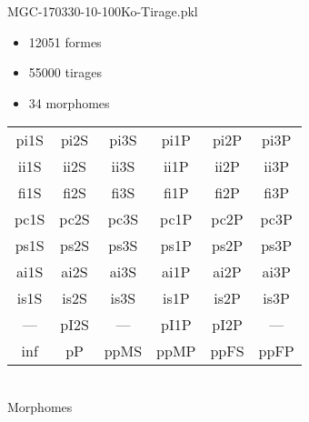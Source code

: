 MGC-170330-10-100Ko-Tirage.pkl
\begin{itemize}
\item 12051 formes
\item 55000 tirages
\item 34 morphomes
\end{itemize}
\begin{center}
\begin{tabular}{cccccc}
\hline
\cellcolor{white}pi1S & \cellcolor{orange}pi2S & \cellcolor{orange}pi3S & \cellcolor{white}pi1P & \cellcolor{white}pi2P & \cellcolor{white}pi3P\\
\cellcolor{brown}ii1S & \cellcolor{brown}ii2S & \cellcolor{brown}ii3S & \cellcolor{white}ii1P & \cellcolor{white}ii2P & \cellcolor{brown}ii3P\\
\cellcolor{yellow}fi1S & \cellcolor{lime}fi2S & \cellcolor{lime}fi3S & \cellcolor{green}fi1P & \cellcolor{white}fi2P & \cellcolor{green}fi3P\\
\cellcolor{yellow}pc1S & \cellcolor{yellow}pc2S & \cellcolor{yellow}pc3S & \cellcolor{white}pc1P & \cellcolor{white}pc2P & \cellcolor{yellow}pc3P\\
\cellcolor{teal}ps1S & \cellcolor{white}ps2S & \cellcolor{teal}ps3S & \cellcolor{white}ps1P & \cellcolor{white}ps2P & \cellcolor{teal}ps3P\\
\cellcolor{white}ai1S & \cellcolor{lightgray}ai2S & \cellcolor{lightgray}ai3S & \cellcolor{white}ai1P & \cellcolor{blue}ai2P & \cellcolor{white}ai3P\\
\cellcolor{pink}is1S & \cellcolor{white}is2S & \cellcolor{lightgray}is3S & \cellcolor{white}is1P & \cellcolor{black}is2P & \cellcolor{pink}is3P\\
--- & \cellcolor{white}pI2S & --- & \cellcolor{white}pI1P & \cellcolor{blue}pI2P & ---\\
\cellcolor{white}inf & \cellcolor{white}pP & \cellcolor{white}ppMS & \cellcolor{white}ppMP & \cellcolor{white}ppFS & \cellcolor{white}ppFP\\
\hline
\end{tabular}\\
Morphomes
\end{center}
\bigskip

